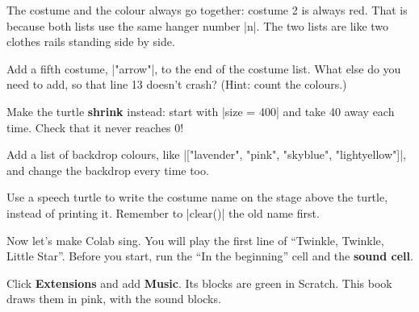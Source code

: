 \begin{think}
The costume and the colour always go together: costume 2 is always red. That is because both lists use the same hanger number \py|n|. The two lists are like two clothes rails standing side by side.
\end{think}

\begin{challenge}
\tick Add a fifth costume, \py|"arrow"|, to the end of the costume list. What else do you need to add, so that line 13 doesn't crash? (Hint: count the colours.)\par
\tick Make the turtle \textbf{shrink} instead: start with \py|size = 400| and take 40 away each time. Check that it never reaches 0!\par
\tick Add a list of backdrop colours, like \py|["lavender", "pink", "skyblue", "lightyellow"]|, and change the backdrop every time too.\par
\tick Use a speech turtle to write the costume name on the stage above the turtle, instead of printing it. Remember to \py|clear()| the old name first.
\end{challenge}


Now let's make Colab sing. You will play the first line of ``Twinkle, Twinkle, Little Star''. Before you start, run the ``In the beginning'' cell and the \textbf{sound cell}.

Click \textbf{Extensions} and add \textbf{Music}. Its blocks are green in Scratch. This book draws them in pink, with the sound blocks.

\begin{center}
\begin{scratch}
\end{scratch}
\end{center}

